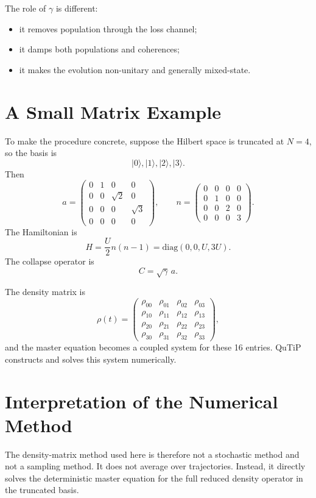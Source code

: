 \documentclass[12pt]{article}
\begin{document}
The role of $\gamma$ is different:
\begin{itemize}
\item it removes population through the loss channel;
\item it damps both populations and coherences;
\item it makes the evolution non-unitary and generally mixed-state.
\end{itemize}

\section*{A Small Matrix Example}
To make the procedure concrete, suppose the Hilbert space is truncated at $N=4$, so the basis is
\[
|0\rangle, |1\rangle, |2\rangle, |3\rangle.
\]
Then
\[
a =
\begin{pmatrix}
0 & 1 & 0 & 0 \\
0 & 0 & \sqrt{2} & 0 \\
0 & 0 & 0 & \sqrt{3} \\
0 & 0 & 0 & 0
\end{pmatrix},
\qquad
n =
\begin{pmatrix}
0 & 0 & 0 & 0 \\
0 & 1 & 0 & 0 \\
0 & 0 & 2 & 0 \\
0 & 0 & 0 & 3
\end{pmatrix}.
\]
The Hamiltonian is
\[
H = \frac{U}{2}n(n-1)
= \mathrm{diag}(0,0,U,3U).
\]
The collapse operator is
\[
C=\sqrt{\gamma}\,a.
\]

The density matrix is
\[
\rho(t)=
\begin{pmatrix}
\rho_{00} & \rho_{01} & \rho_{02} & \rho_{03} \\
\rho_{10} & \rho_{11} & \rho_{12} & \rho_{13} \\
\rho_{20} & \rho_{21} & \rho_{22} & \rho_{23} \\
\rho_{30} & \rho_{31} & \rho_{32} & \rho_{33}
\end{pmatrix},
\]
and the master equation becomes a coupled system for these 16 entries. QuTiP constructs and solves this system numerically.

\section*{Interpretation of the Numerical Method}
The density-matrix method used here is therefore not a stochastic method and not a sampling method. It does not average over trajectories. Instead, it directly solves the deterministic master equation for the full reduced density operator in the truncated basis.
\end{document}
